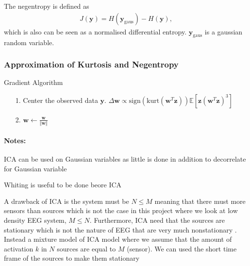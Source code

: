 The negentropy is defined as 
\begin{align*}
J(\mathbf{y}) = H(\mathbf{y}_{\text{gaus}}) - H(\mathbf{y}),
\end{align*}
which is also can be seen as a normalised differential entropy. $\mathbf{y}_{\text{gaus}}$ is a gaussian random variable.

\subsubsection{Approximation of Kurtosis and Negentropy}
\begin{algorithm}[H]
\caption{Gradient Algorithm}
\begin{itemize}
\item[1.] Center the observed data $\mathbf{y}$. $\Delta \mathbf{w} \propto \text{sign}(\text{kurt}(\mathbf{w}^T \mathbf{z})) \mathbb{E}[\mathbf{z} (\mathbf{w}^T \mathbf{z})^3 ]$
\item[2.] $\mathbf{w} \leftarrow \frac{\mathbf{w}}{\Vert \mathbf{w} \Vert}$
\end{itemize}
\end{algorithm}

\paragraph{Notes:}
ICA can be used on Gaussian variables as little is done in addition to decorrelate for Gaussian variable

Whiting is useful to be done beore ICA

A drawback of ICA is the system must be $N \leq M$ meaning that there must more sensors than sources which is not the case in this project where we look at low density EEG system, $M \leq N$. Furthermore, ICA need that the sources are stationary which is not the nature of EEG that are very much nonstationary \cite[p. 7-8]{PHD}.
\\
Instead a mixture model of ICA model where we assume that the amount of activation $k$ in $N$ sources are equal to $M$ (sensor). We can used the short time frame of the sources to make them stationary
